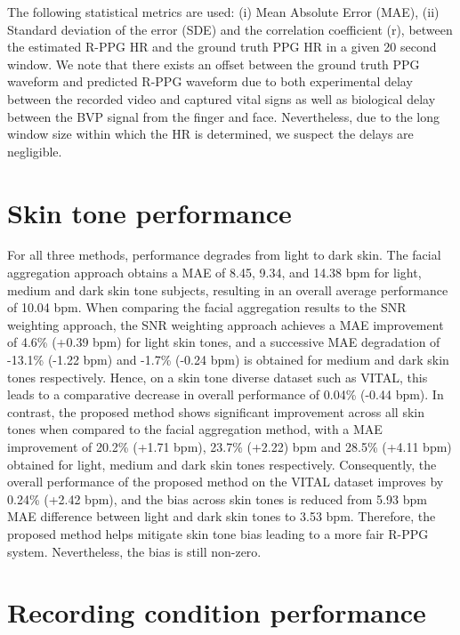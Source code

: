 The following statistical metrics are used: (i) Mean Absolute Error (MAE), (ii) Standard deviation of the error (SDE) and the correlation coefficient (r), between the estimated R-PPG HR and the ground truth PPG HR in a given 20 second window. We note that there exists an offset between the ground truth PPG waveform and predicted R-PPG waveform due to both experimental delay between the recorded video and captured vital signs as well as biological delay between the BVP signal from the finger and face. Nevertheless, due to the long window size within which the HR is determined, we suspect the delays are negligible. 

\section{Skin tone performance}

For all three methods, performance degrades from light to dark skin. The facial aggregation approach obtains a MAE of 8.45, 9.34, and 14.38 bpm for light, medium and dark skin tone subjects, resulting in an overall average performance of 10.04 bpm. When comparing the facial aggregation results to the SNR weighting approach, the SNR weighting approach achieves a MAE improvement of 4.6\% (+0.39 bpm) for light skin tones, and a successive MAE degradation of -13.1\% (-1.22 bpm) and -1.7\% (-0.24 bpm) is obtained for medium and dark skin tones respectively. Hence, on a skin tone diverse dataset such as VITAL, this leads to a comparative decrease in overall performance of 0.04\% (-0.44 bpm). In contrast, the proposed method shows significant improvement across all skin tones when compared to the facial aggregation method, with a MAE improvement of 20.2\% (+1.71 bpm), 23.7\% (+2.22) bpm and 28.5\% (+4.11 bpm) obtained for light, medium and dark skin tones respectively. Consequently, the overall performance of the proposed method on the VITAL dataset improves by 0.24\% (+2.42 bpm), and the bias across skin tones is reduced from 5.93 bpm MAE difference between light and dark skin tones to 3.53 bpm. Therefore, the proposed method helps mitigate skin tone bias leading to a more fair R-PPG system. Nevertheless, the bias is still non-zero.  

\section{Recording condition performance}

